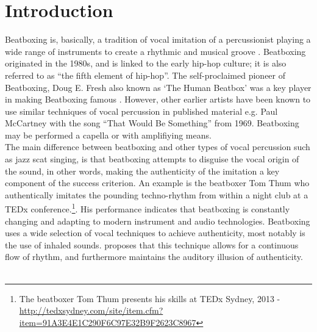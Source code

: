 \section{ Introduction }
Beatboxing is, basically, a tradition of vocal imitation of a percussionist playing a wide range of instruments to create a rhythmic and musical groove \citep{Stowell2008}. Beatboxing originated in the 1980s, and is linked to the early hip-hop culture; it is also referred to as “the fifth element of hip-hop”. The self-proclaimed pioneer of Beatboxing, Doug E. Fresh also known as ‘The Human Beatbox’ was a key player in making Beatboxing famous \citep{Hess2007}. However, other earlier artists have been known to use similar techniques of vocal percussion in published material e.g. Paul McCartney with the song “That Would Be Something” from 1969.
Beatboxing may be performed a capella or with amplifiying means\citep{Stowell2008}.\\ The main difference between beatboxing and other types of vocal percussion such as jazz scat singing, is that beatboxing attempts to disguise the vocal origin of the sound\citep{Stowell2008}, in other words, making the authenticity of the imitation a key component of the success criterion.  An example is the beatboxer Tom Thum who authentically imitates the pounding techno-rhythm from within a night club at a TEDx conference.\footnote{The beatboxer Tom Thum presents his skills at TEDx Sydney, 2013 - \url{http://tedxsydney.com/site/item.cfm?item=91A3E4E1C290F6C97E32B9F2623C8967}}. His performance indicates that beatboxing is constantly changing and adapting to modern instrument and audio technologies. Beatboxing uses a wide selection of vocal techniques to achieve authenticity, most notably is the use of inhaled sounds. \citep{Stowell2008} proposes that this technique allows for a continuous flow of rhythm, and furthermore maintains the auditory illusion of authenticity.\\
\\


